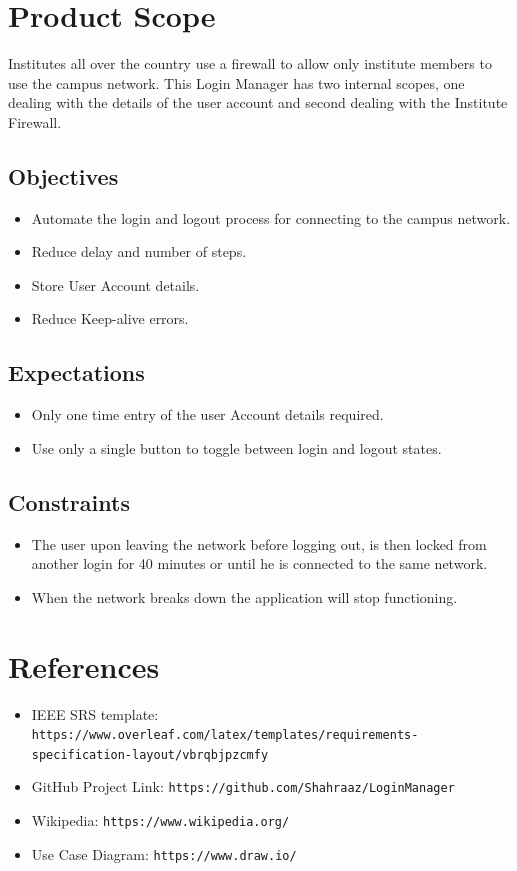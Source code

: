 \section{Product Scope}
Institutes all over the country use a firewall to allow only institute members to use the campus network. This Login Manager has two internal scopes, one dealing with the details of the user account and second dealing with the Institute Firewall.

\subsection{Objectives}
\begin{itemize}
    \item Automate the login and logout process for connecting to the campus network.
    \item Reduce delay and number of steps.
    \item Store User Account details.
    \item Reduce Keep-alive errors.
\end{itemize}

\subsection{Expectations}
\begin{itemize}
    \item Only one time entry of the user Account details required.
    \item Use only a single button to toggle between login and logout states.
\end{itemize}

\subsection{Constraints}
\begin{itemize}
    \item The user upon leaving the network before logging out, is then locked from another login for 40 minutes or until he is connected to the same network.
    \item When the network breaks down the application will stop functioning. 
\end{itemize}

\section{References}
\begin{itemize}
    \item IEEE SRS template: \\ \texttt{https://www.overleaf.com/latex/templates/requirements-specification-layout/vbrqbjpzcmfy}
    \item GitHub Project Link: \texttt{https://github.com/Shahraaz/LoginManager}
    \item Wikipedia: \texttt{https://www.wikipedia.org/}
    \item Use Case Diagram: \texttt{https://www.draw.io/}
\end{itemize}


